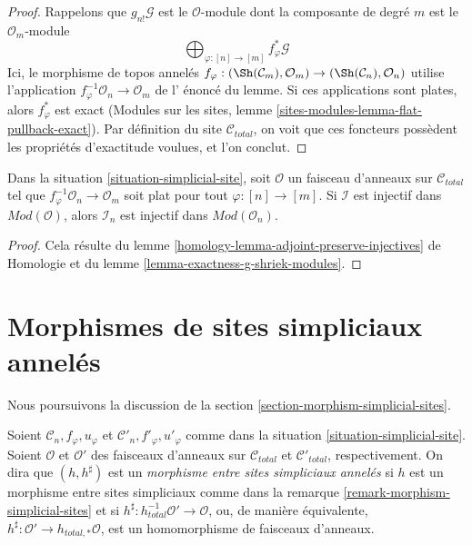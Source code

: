 \begin{proof}
Rappelons que $g_{n!}\mathcal{G}$ est le $\mathcal{O}$-module
dont la composante de degré $m$ est le $\mathcal{O}_m$-module
$$
\bigoplus\nolimits_{\varphi : [n] \to [m]} f_\varphi^*\mathcal{G}
$$
Ici, le morphisme de topos annelés
$f_\varphi : (\Sh(\mathcal{C}_m), \mathcal{O}_m) \to
(\Sh(\mathcal{C}_n), \mathcal{O}_n)$ utilise l'application
$f_\varphi^{-1}\mathcal{O}_n \to \mathcal{O}_m$ de l'
énoncé du lemme. Si ces applications sont plates, alors
$f_\varphi^*$ est exact
(Modules sur les sites, lemme \ref{sites-modules-lemma-flat-pullback-exact}).
Par définition du site $\mathcal{C}_{total}$, on voit que ces
foncteurs possèdent les propriétés d'exactitude voulues, et l'on conclut.
\end{proof}

\begin{lemma}
\label{lemma-restriction-injective-to-component-site-module}
Dans la situation \ref{situation-simplicial-site},
soit $\mathcal{O}$ un faisceau d'anneaux sur $\mathcal{C}_{total}$
tel que $f_\varphi^{-1}\mathcal{O}_n \to \mathcal{O}_m$
soit plat pour tout $\varphi : [n] \to [m]$.
Si $\mathcal{I}$ est injectif dans $\textit{Mod}(\mathcal{O})$, alors
$\mathcal{I}_n$ est injectif dans $\textit{Mod}(\mathcal{O}_n)$.
\end{lemma}

\begin{proof}
Cela résulte du
lemme \ref{homology-lemma-adjoint-preserve-injectives} de Homologie
et du
lemme \ref{lemma-exactness-g-shriek-modules}.
\end{proof}







\section{Morphismes de sites simpliciaux annelés}
\label{section-morphism-simplicial-sites-modules}

\noindent
Nous poursuivons la discussion de la section \ref{section-morphism-simplicial-sites}.

\begin{remark}
\label{remark-morphism-simplicial-sites-modules}
Soient $\mathcal{C}_n, f_\varphi, u_\varphi$ et
$\mathcal{C}'_n, f'_\varphi, u'_\varphi$ comme dans la
situation \ref{situation-simplicial-site}.
Soient $\mathcal{O}$ et $\mathcal{O}'$
des faisceaux d'anneaux sur $\mathcal{C}_{total}$ et $\mathcal{C}'_{total}$, respectivement.
On dira que $(h, h^\sharp)$ est un
{\it morphisme entre sites simpliciaux annelés}
si $h$ est un morphisme entre sites simpliciaux comme dans la
remarque \ref{remark-morphism-simplicial-sites}
et si $h^\sharp : h_{total}^{-1}\mathcal{O}' \to \mathcal{O}$,
ou, de manière équivalente, $h^\sharp : \mathcal{O}' \to h_{total, *}\mathcal{O}$,
est un homomorphisme de faisceaux d'anneaux.
\end{remark}

